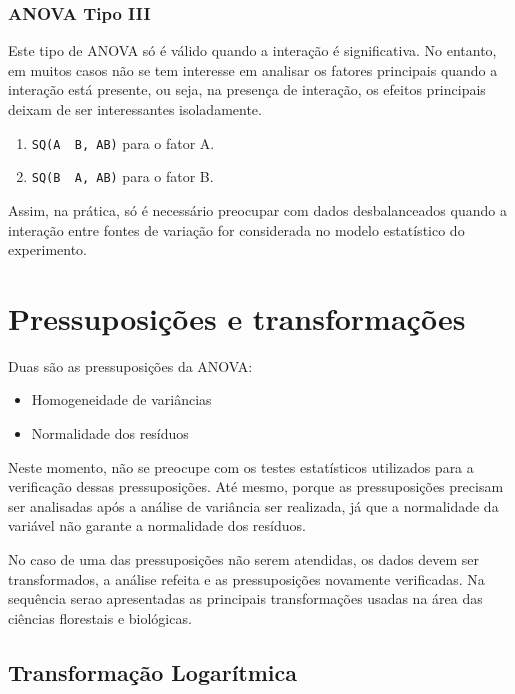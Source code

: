 \documentclass[
]{article}
\providecommand{\tightlist}{%
  \setlength{\itemsep}{0pt}\setlength{\parskip}{0pt}}
\begin{document}
\hypertarget{anova-tipo-iii}{%
\subsubsection{ANOVA Tipo III}\label{anova-tipo-iii}}

Este tipo de ANOVA só é válido quando a interação é significativa. No entanto, em muitos casos não se tem interesse em analisar os fatores principais quando a interação está presente, ou seja, na presença de interação, os efeitos principais deixam de ser interessantes isoladamente.

\begin{enumerate}
\def\labelenumi{\arabic{enumi}.}
\tightlist
\item
  \texttt{SQ(A\ \textbar{}\ B,\ AB)} para o fator A.
\item
  \texttt{SQ(B\ \textbar{}\ A,\ AB)} para o fator B.
\end{enumerate}

Assim, na prática, só é necessário preocupar com dados desbalanceados quando a interação entre fontes de variação for considerada no modelo estatístico do experimento.

\hypertarget{pressuposiuxe7uxf5es-e-transformauxe7uxf5es}{%
\section{Pressuposições e transformações}\label{pressuposiuxe7uxf5es-e-transformauxe7uxf5es}}

Duas são as pressuposições da ANOVA:

\begin{itemize}
\tightlist
\item
  Homogeneidade de variâncias
\item
  Normalidade dos resíduos
\end{itemize}

Neste momento, não se preocupe com os testes estatísticos utilizados para a verificação dessas pressuposições. Até mesmo, porque as pressuposições precisam ser analisadas após a análise de variância ser realizada, já que a normalidade da variável não garante a normalidade dos resíduos.

No caso de uma das pressuposições não serem atendidas, os dados devem ser transformados, a análise refeita e as pressuposições novamente verificadas. Na sequência serao apresentadas as principais transformações usadas na área das ciências florestais e biológicas.

\hypertarget{transformauxe7uxe3o-logaruxedtmica}{%
\subsection{Transformação Logarítmica}\label{transformauxe7uxe3o-logaruxedtmica}}
\end{document}
